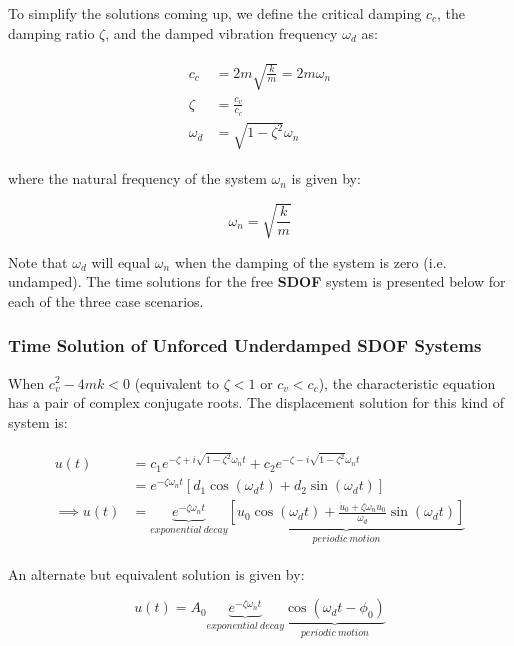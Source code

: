 \documentclass[10pt,b5paper,titlepage]{book}
\newenvironment{eqarray}
{
    \begin{eqnarray}
        \begin{aligned}
}
{
        \end{aligned}
    \end{eqnarray}
}
\begin{document}
To simplify the solutions coming up, we define the critical damping $ c_c $,
the damping ratio $ \zeta $, and the damped vibration frequency $ \omega_d $ as:

\begin{eqarray}
    c_c &= 2 m \sqrt{\frac{k}{m}} = 2 m \omega_n\\
    \zeta &= \frac{c_v}{c_c}\\
    \omega_d &= \sqrt{1 - \zeta^2} \omega_n
\end{eqarray}

where the natural frequency of the system $ \omega_n $ is given by:

\begin{equation}
    \omega_n = \sqrt{\frac{k}{m}}
\end{equation}

Note that $ \omega_d $ will equal $ \omega_n $ when the damping of the system
is zero (i.e. undamped). The time solutions for the free \textbf{SDOF}
system is presented below for each of the three case scenarios.

\subsubsection{Time Solution of Unforced Underdamped SDOF Systems}

When $ c_v^2 - 4 m k < 0 $ (equivalent to $ \zeta < 1 $ or $ c_v < c_c $),
the characteristic equation has a pair of complex conjugate roots. The displacement
solution for this kind of system is:

\begin{eqarray}
    u(t) &= c_1 e^{-\zeta + i \sqrt{1 - \zeta^2} \omega_n t}
          + c_2 e^{-\zeta - i \sqrt{1 - \zeta^2} \omega_n t}\\
         &= e^{-\zeta \omega_n t} \left[ d_1 \cos{(\omega_d t)}
                                       + d_2 \sin{(\omega_d t)} \right]\\
    \implies u(t) &= \underbrace{e^{-\zeta \omega_n t}}_{exponential\ decay}
    \underbrace{\left[ u_0 \cos{(\omega_d t)}
    + \frac{\dot{u}_0 + \zeta \omega_n u_0}{\omega_d} \sin{(\omega_d t)}
    \right]}_{periodic\ motion}
\end{eqarray}

An alternate but equivalent solution is given by:

\begin{equation}
    u(t) = A_0 \underbrace{e^{-\zeta \omega_n t}}_{exponential\ decay}
    \underbrace{\cos{(\omega_d t - \phi_0)}}_{periodic\ motion}
\end{equation}
\end{document}
